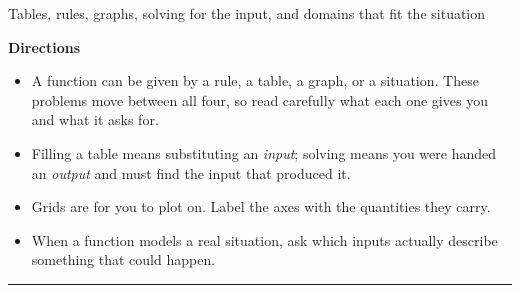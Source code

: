 \documentclass[12pt]{article}
\begin{document}

\begin{center}
\small Tables, rules, graphs, solving for the input, and domains that fit the situation
\end{center}
\vspace{0.15cm}

\noindent\textbf{Directions}
\begin{itemize}[leftmargin=0.8cm, itemsep=1pt, topsep=2pt]
  \item A function can be given by a rule, a table, a graph, or a situation. These problems move between all four, so read carefully what each one gives you and what it asks for.
  \item Filling a table means substituting an \emph{input}; solving means you were handed an \emph{output} and must find the input that produced it.
  \item Grids are for you to plot on. Label the axes with the quantities they carry.
  \item When a function models a real situation, ask which inputs actually describe something that could happen.
\end{itemize}

\vspace{0.2cm}
\noindent\rule{\linewidth}{0.4pt}



\end{document}
